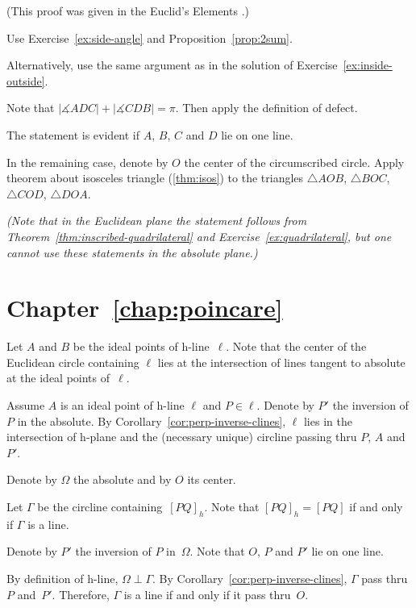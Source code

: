 (This proof was given in the Euclid's Elements \cite[Book I, Proposition 26]{euclid}.)

Use Exercise~\ref{ex:side-angle} and Proposition~\ref{prop:2sum}.

Alternatively, use the same argument as in the solution of Exercise~\ref{ex:inside-outside}.


Note that 
$|\measuredangle ADC|+|\measuredangle CDB|=\pi$.
Then apply the definition of defect.

The statement is evident if $A$, $B$, $C$ and $D$ lie on one line.

In the remaining case, 
denote by $O$ the center of the circumscribed circle.
Apply theorem about isosceles triangle (\ref{thm:isos}) to the triangles 
$\triangle AOB$,
$\triangle BOC$, 
$\triangle COD$, 
$\triangle DOA$. 

\textit{(Note that in the Euclidean plane the statement follows from Theorem~\ref{thm:inscribed-quadrilateral} and Exercise~\ref{ex:quadrilateral},
but one cannot use these statements in the absolute plane.)}

\section*{Chapter~\ref{chap:poincare}}
\setcounter{eqtn}{0}

Let $A$ and $B$ be the ideal points of h-line~$\ell$. 
Note that the center of the Euclidean circle containing $\ell$ lies 
at the intersection of lines tangent to absolute at the ideal points of~$\ell$.

Assume $A$ is an ideal point of h-line $\ell$
and $P\in \ell$.
Denote by $P'$ the inversion of $P$ in the absolute.
By Corollary~\ref{cor:perp-inverse-clines},
$\ell$ lies in the intersection of h-plane and the (necessary unique) circline 
passing thru $P$, $A$ and~$P'$.

Denote by $\Omega$ the absolute and by $O$ its center. 

Let $\Gamma$ be the circline containing~$[PQ]_h$.
Note that $[PQ]_h=[PQ]$ if and only if $\Gamma$ is a line.

Denote by $P'$ the inversion of $P$ in~$\Omega$.
Note that $O$, $P$ and $P'$ lie on one line.

By definition of h-line, $\Omega\perp \Gamma$.
By Corollary~\ref{cor:perp-inverse-clines}, $\Gamma$ pass thru $P$ and~$P'$. 
Therefore, $\Gamma$
is a line if and only if it pass thru~$O$.


